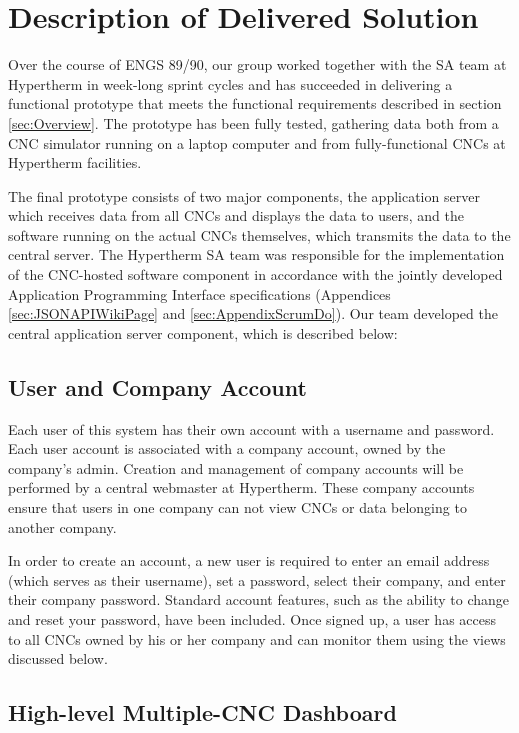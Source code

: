 \documentclass[12pt,letterpaper,titlepage]{article}
\begin{document}
\section{Description of Delivered Solution} \label{sec:DescriptionofDeliveredSolution}

Over the course of ENGS 89/90, our group worked together with the SA team at Hypertherm in week-long sprint cycles and has succeeded in delivering a functional prototype that meets the functional requirements described in section \ref{sec:Overview}. The prototype has been fully tested, gathering data both from a CNC simulator running on a laptop computer and from fully-functional CNCs at Hypertherm facilities.

The final prototype consists of two major components, the application server which receives data from all CNCs and displays the data to users, and the software running on the actual CNCs themselves, which transmits the data to the central server. The Hypertherm SA team was responsible for the implementation of the CNC-hosted software component in accordance with the jointly developed Application Programming Interface specifications (Appendices \ref{sec:JSONAPIWikiPage} and \ref{sec:AppendixScrumDo}). Our team developed the central application server component, which is described below:

\subsection{User and Company Account} \label{sec:UserandCompanyAccounts}

Each user of this system has their own account with a username and password. Each user account is associated with a company account, owned by the company's admin. Creation and management of company accounts will be performed by a central webmaster at Hypertherm. These company accounts ensure that users in one company can not view CNCs or data belonging to another company.

In order to create an account, a new user is required to enter an email address (which serves as their username), set a password, select their company, and enter their company password. Standard account features, such as the ability to change and reset your password, have been included. Once signed up, a user has access to all CNCs owned by his or her company and can monitor them using the views discussed below.

\subsection{High-level Multiple-CNC Dashboard} \label{sec:HighlevelMultipleCNCDashboard}
\end{document}
